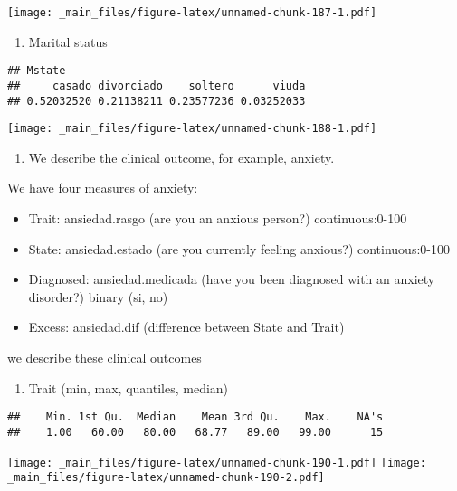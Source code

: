 \documentclass[
]{book}
\providecommand{\tightlist}{%
  \setlength{\itemsep}{0pt}\setlength{\parskip}{0pt}}
\begin{document}
\texttt{[image: \_main\_files/figure-latex/unnamed-chunk-187-1.pdf]}

\begin{enumerate}
\def\labelenumi{\alph{enumi}.}
\setcounter{enumi}{3}
\tightlist
\item
  Marital status
\end{enumerate}

\begin{verbatim}
## Mstate
##     casado divorciado    soltero      viuda 
## 0.52032520 0.21138211 0.23577236 0.03252033
\end{verbatim}

\texttt{[image: \_main\_files/figure-latex/unnamed-chunk-188-1.pdf]}

\begin{enumerate}
\def\labelenumi{\arabic{enumi}.}
\setcounter{enumi}{1}
\tightlist
\item
  We describe the clinical outcome, for example, anxiety.
\end{enumerate}

We have four measures of anxiety:

\begin{itemize}
\tightlist
\item
  Trait: ansiedad.rasgo (are you an anxious person?) continuous:0-100
\item
  State: ansiedad.estado (are you currently feeling anxious?) continuous:0-100
\item
  Diagnosed: ansiedad.medicada (have you been diagnosed with an anxiety disorder?) binary (si, no)
\item
  Excess: ansiedad.dif (difference between State and Trait)
\end{itemize}

we describe these clinical outcomes

\begin{enumerate}
\def\labelenumi{\alph{enumi}.}
\tightlist
\item
  Trait (min, max, quantiles, median)
\end{enumerate}

\begin{verbatim}
##    Min. 1st Qu.  Median    Mean 3rd Qu.    Max.    NA's 
##    1.00   60.00   80.00   68.77   89.00   99.00      15
\end{verbatim}

\texttt{[image: \_main\_files/figure-latex/unnamed-chunk-190-1.pdf]} \texttt{[image: \_main\_files/figure-latex/unnamed-chunk-190-2.pdf]}
\end{document}
